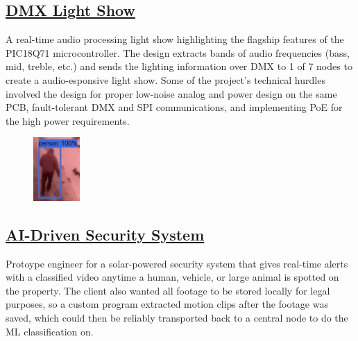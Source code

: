 \documentclass[
	10pt, %
]{FreemanCV}
\begin{document}
\begin{paracol}{2}
\vspace*{-10pt} %
\leavevmode\subsection{\href{https://github.com/jfcbooth/3dpp}{DMX Light Show \scriptsize\faLink}}

A real-time audio processing light show highlighting the flagship features of the PIC18Q71 microcontroller.
The design extracts bands of audio frequencies (bass, mid, treble, etc.) and sends the lighting information over DMX to 1 of 7 nodes to create a audio-esponsive light show.
Some of the project's technical hurdles involved the design for proper low-noise analog and power design on the same PCB, fault-tolerant DMX and SPI communications, and implementing PoE for the high power requirements.



\setlength\intextsep{20pt} %
\begin{figure} %
    \includegraphics[width=50pt]{security_system} %
\end{figure}

\vspace*{-10pt}
\leavevmode \subsection{\href{https://github.com/jfcbooth/security_system}{AI-Driven Security System \scriptsize\faLink}}

Protoype engineer for a solar-powered security system that gives real-time alerts with a classified video anytime a human, vehicle, or large animal is spotted
on the property. The client also wanted all footage to be stored locally for legal purposes, so a custom program extracted motion clips
after the footage was saved, which could then be reliably transported back to a central node to do the ML classification on.


\end{paracol}
\end{document}
